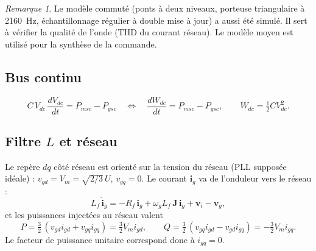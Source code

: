 \documentclass[11pt,a4paper]{article}
\theoremstyle{remark}
\newtheorem{remarque}{Remarque}
\newcommand{\Jm}{\mathbf{J}}            %
\newcommand{\vect}[1]{\bm{#1}}
\begin{document}
\begin{remarque}
Le modèle commuté (ponts à deux niveaux, porteuse triangulaire à \SI{2160}{Hz}, échantillonnage
régulier à double mise à jour) a aussi été simulé. Il sert à vérifier la qualité de l'onde
(THD du courant réseau). Le modèle moyen est utilisé pour la synthèse de la commande.
\end{remarque}

\subsection{Bus continu}
\begin{equation}
  C\,V_{dc}\,\frac{dV_{dc}}{dt} = P_{msc} - P_{gsc}
  \quad\Longleftrightarrow\quad
  \frac{dW_{dc}}{dt} = P_{msc} - P_{gsc}, \qquad W_{dc} = \tfrac12 C V_{dc}^2 .
  \label{eq:bus}
\end{equation}

\subsection{Filtre \texorpdfstring{$L$}{L} et réseau}
Le repère $dq$ côté réseau est orienté sur la tension du réseau (PLL supposée idéale) :
$v_{gd}=V_m=\sqrt{2/3}\,U$, $v_{gq}=0$. Le courant $\vect{i}_g$ va de l'onduleur vers le réseau :
\begin{equation}
  L_f\,\dot{\vect{i}}_g = -R_f\,\vect{i}_g + \omega_g L_f\,\Jm\,\vect{i}_g + \vect{v}_i - \vect{v}_g ,
  \label{eq:filtre}
\end{equation}
et les puissances injectées au réseau valent
\begin{equation}
  P = \tfrac32\,(v_{gd} i_{gd} + v_{gq} i_{gq}) = \tfrac32 V_m i_{gd}, \qquad
  Q = \tfrac32\,(v_{gq} i_{gd} - v_{gd} i_{gq}) = -\tfrac32 V_m i_{gq}.
\end{equation}
Le facteur de puissance unitaire correspond donc à $i_{gq}=0$.
\end{document}
